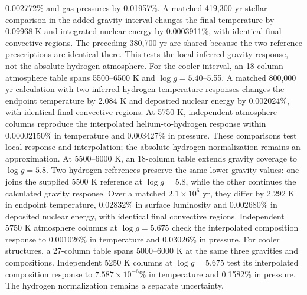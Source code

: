 \documentclass[11pt,letterpaper]{article}
\begin{document}
0.002772\% and gas pressures by 0.01957\%.
A matched 419,300 yr stellar comparison in the added gravity interval
changes the final temperature by 0.09968 K and integrated nuclear energy
by 0.0003911\%, with identical final convective regions. The preceding
380,700 yr are shared because the two reference prescriptions are identical
there. This tests the local inferred gravity response, not the absolute
hydrogen atmosphere.
For the cooler interval, an 18-column atmosphere table spans
5500--6500 K and $\log g=5.40$--5.55. A matched 800,000 yr calculation
with two inferred hydrogen temperature responses changes the endpoint
temperature by 2.084 K and deposited nuclear energy by 0.002024\%,
with identical final convective regions. At 5750 K, independent atmosphere
columns reproduce the interpolated helium-to-hydrogen response within
0.00002150\% in temperature and 0.003427\% in pressure. These comparisons
test local response and interpolation; the absolute hydrogen normalization
remains an approximation.
At 5500--6000 K, an 18-column table extends gravity coverage to
$\log g=5.8$. Two hydrogen references preserve the same lower-gravity
values: one joins the supplied 5500 K reference at $\log g=5.8$, while
the other continues the calculated gravity response. Over a matched
$2.1\times10^6$ yr, they differ by 2.292 K in endpoint temperature,
0.02832\% in surface luminosity and 0.002680\% in deposited nuclear energy,
with identical final convective regions. Independent 5750 K atmosphere
columns at $\log g=5.675$ check the interpolated composition response
to 0.001026\% in temperature and 0.03026\% in pressure.
For cooler structures, a 27-column table spans 5000--6000 K at the same
three gravities and compositions. Independent 5250 K columns at
$\log g=5.675$ test its interpolated composition response to
$7.587\times10^{-6}$\% in temperature and 0.1582\% in pressure.
The hydrogen normalization remains a separate uncertainty.
\end{document}
